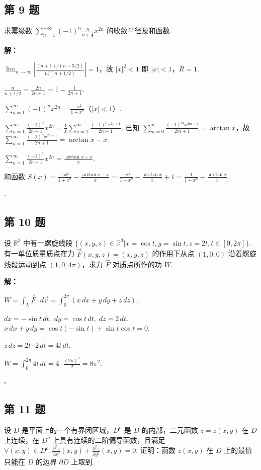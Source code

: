 \documentclass[12pt,a4paper]{article}
\newenvironment{sol}[1][解]{%
  \par\medskip\noindent\textbf{#1：}\itshape\par\noindent\ignorespaces
}{%
  \par\hfill$\square$\par\medskip
}
\begin{document}
\subsection*{第 9 题}
求幂级数 $\sum_{n=1}^{+\infty}(-1)^n \frac{n}{n+\frac{1}{2}}x^{2n}$ 的收敛半径及和函数.

\begin{sol}$\lim_{n\to\infty}\left|\frac{(n+1)/(n+3/2)}{n/(n+1/2)}\right|=1$，故
  $|x|^2<1$ 即 $|x|<1$，$R=1$.

  $\frac{n}{n+1/2}=\frac{2n}{2n+1}=1-\frac{1}{2n+1}$.

  $\sum_{n=1}^{\infty}(-1)^n x^{2n}=\frac{-x^2}{1+x^2}$（$|x|<1$）.

  $\sum_{n=1}^{\infty}\frac{(-1)^n}{2n+1}x^{2n}=\frac{1}{x}\sum_{n=1}^{\infty}\frac{(-1)^n
  x^{2n+1}}{2n+1}$. 已知 $\sum_{m=0}^{\infty}\frac{(-1)^m
  x^{2m+1}}{2m+1}=\arctan x$，故 $\sum_{n=1}^{\infty}\frac{(-1)^n
  x^{2n+1}}{2n+1}=\arctan x - x$.

  $\sum_{n=1}^{\infty}\frac{(-1)^n}{2n+1}x^{2n}=\frac{\arctan x - x}{x}$.

  和函数 $S(x)=\frac{-x^2}{1+x^2}-\frac{\arctan x -
  x}{x}=\frac{-x^2}{1+x^2}-\frac{\arctan
  x}{x}+1=\frac{1}{1+x^2}-\frac{\arctan x}{x}$.

\end{sol}
\subsection*{第 10 题}
设 $\mathbb{R}^3$ 中有一螺旋线段 $\{(x,y,z)\in\mathbb{R}^3|x=\cos t, y=\sin
t, z=2t, t\in[0,2\pi]\}$. 有一单位质量质点在力 $\vec{F}(x,y,z)=(x,y,z)$ 的作用下从点
$(1,0,0)$ 沿着螺旋线段运动到点 $(1,0,4\pi)$，求力 $\vec{F}$ 对质点所作的功 $W$.

\begin{sol}$W=\int_L\vec{F}\cdot
  d\vec{r}=\int_0^{2\pi}(x\,dx+y\,dy+z\,dz)$.

  $dx=-\sin t\,dt,\; dy=\cos t\,dt,\; dz=2\,dt$. $x\,dx+y\,dy=\cos
  t(-\sin t)+\sin t\cos t=0$.

  $z\,dz=2t\cdot 2\,dt=4t\,dt$.

  $W=\int_0^{2\pi}4t\,dt=4\cdot\frac{(2\pi)^2}{2}=8\pi^2.$

\end{sol}
\subsection*{第 11 题}
设 $D$ 是平面上的一个有界闭区域，$D^o$ 是 $D$ 的内部，二元函数 $z=z(x,y)$ 在 $D$ 上连续，在 $D^o$
上具有连续的二阶偏导函数，且满足 $\forall(x,y)\in D^o, \frac{\partial^2 z}{\partial
x^2}(x,y)+\frac{\partial^2 z}{\partial y^2}(x,y)=0$. 证明：函数 $z(x,y)$ 在
$D$ 上的最值只能在 $D$ 的边界 $\partial D$ 上取到.
\end{document}
